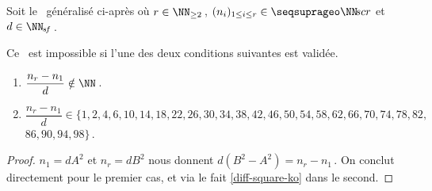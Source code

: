 \begin{fact} \label{sftable-illegal-0-sol}
	Soit le \sftab\ généralisé ci-après où
	$r \in \NN_{\geq 2}$\,,
	$( n_i )_{1 \leq i \leq r} \in \NNseq[r]$
	et
	$d \in \NNsf$\,.

    \begin{center}
    \end{center}

	Ce \sftab\ est impossible si l'une des deux conditions suivantes est validée.
	
	\begin{enumerate}
		\item $\dfrac{n_r - n_1}{d} \notin \NN$\,.

		\item $\dfrac{n_r - n_1}{d} \in \{ 1, 2, 4, 6, 10, 14, 18, 22, 26, 30, 34, 38, 42, 46, 50, 54, 58, 62, 66, 70, 74, 78, 82,$ \\ $86, 90, 94, 98 \}$\,.
	\end{enumerate}
\end{fact}


\begin{proof}
	$n_1 = d A^2$ et $n_r = d B^2$ nous donnent $d (B^2 - A^2) = n_r - n_1$\,. On conclut directement pour le premier cas, et via le fait \ref{diff-square-ko} dans le second.
\end{proof}

